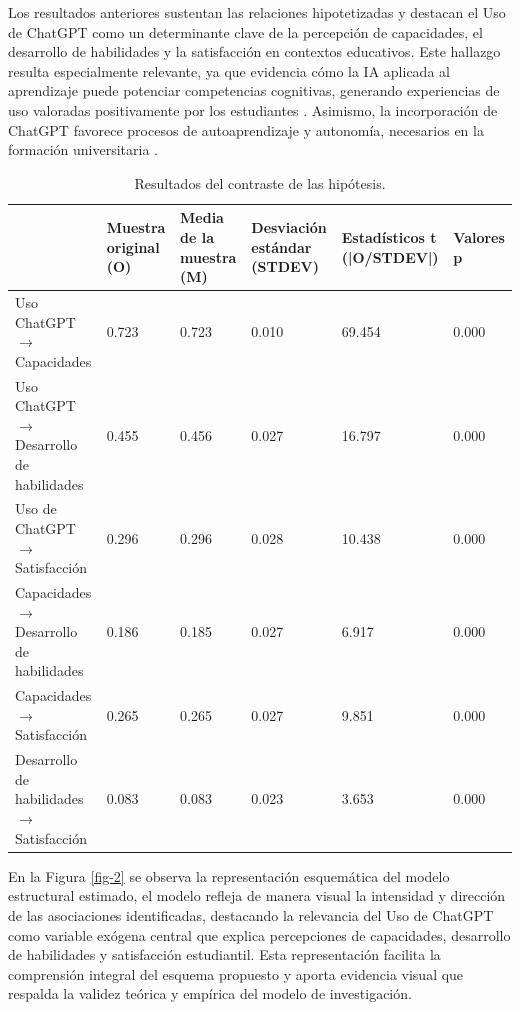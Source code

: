 \documentclass[spanish]{textolivre}
\begin{document}
Los resultados anteriores sustentan las relaciones hipotetizadas y destacan el Uso de ChatGPT como un determinante clave de la percepción de capacidades, el desarrollo de habilidades y la satisfacción en contextos educativos. Este hallazgo resulta especialmente relevante, ya que evidencia cómo la IA aplicada al aprendizaje puede potenciar competencias cognitivas, generando experiencias de uso valoradas positivamente por los estudiantes \cite{kim2025}. Asimismo, la incorporación de ChatGPT favorece procesos de autoaprendizaje y autonomía, necesarios en la formación universitaria \cite{jia2024}. 

\begin{table}[htbp]
\centering
\small
\caption{Resultados del contraste de las hipótesis.}\label{tab-8}
\begin{tabular}{p{2.5cm} p{2.2cm} p{2.2cm} p{2.2cm} p{2cm} p{1cm}}
\toprule
 & Muestra original (O) & Media de la muestra (M) & Desviación \newline estándar \newline(STDEV) & Estadísticos t (|O/STDEV|) & Valores p \\
\midrule
Uso ChatGPT $\rightarrow$  Capacidades & 0.723 & 0.723 & 0.010 & 69.454 & 0.000 \\
Uso ChatGPT $\rightarrow$ Desarrollo de habilidades & 0.455 & 0.456 & 0.027 & 16.797 & 0.000 \\
Uso de ChatGPT $\rightarrow$ Satisfacción & 0.296 & 0.296 & 0.028 & 10.438 & 0.000 \\
Capacidades $\rightarrow$  Desarrollo de habilidades & 0.186 & 0.185 & 0.027 & 6.917 & 0.000 \\
Capacidades $\rightarrow$  Satisfacción & 0.265 & 0.265 & 0.027 & 9.851 & 0.000 \\
Desarrollo de habilidades $\rightarrow$  Satisfacción & 0.083 & 0.083 & 0.023 & 3.653 & 0.000 \\
\bottomrule
\end{tabular}
\end{table}

En la Figura \ref{fig-2} se observa la representación esquemática del modelo estructural estimado, el modelo refleja de manera visual la intensidad y dirección de las asociaciones identificadas, destacando la relevancia del Uso de ChatGPT como variable exógena central que explica percepciones de capacidades, desarrollo de habilidades y satisfacción estudiantil. Esta representación facilita la comprensión integral del esquema propuesto y aporta evidencia visual que respalda la validez teórica y empírica del modelo de investigación.
\end{document}
